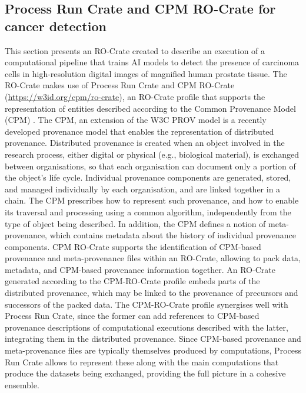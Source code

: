 \documentclass[10pt,letterpaper]{article}
\begin{document}
\subsection{Process Run Crate and CPM RO-Crate for cancer detection}\label{process-run-crate-and-cpm-ro-crate-for-cancer-detection}

This section presents an RO-Crate created to describe an execution of a computational pipeline that trains AI models to detect the presence of carcinoma cells in high-resolution digital images of magnified human prostate tissue.
The RO-Crate makes use of Process Run Crate and CPM RO-Crate (\url{https://w3id.org/cpm/ro-crate}), an RO-Crate profile that supports the representation of entities described according to the Common Provenance Model (CPM) \cite{Wittner 2022,Wittner 2023b}. 
The CPM, an extension of the W3C PROV model \cite{Moreau 2013} is a recently developed provenance model that enables the representation of distributed provenance. 
Distributed provenance is created when an object involved in the research process, either digital or physical (e.g., biological material), is exchanged between organisations, so that each organisation can document only a portion of the object’s life cycle. 
Individual provenance components are generated, stored, and managed individually by each organisation, and are linked together in a chain. 
The CPM prescribes how to represent such provenance, and how to enable its traversal and processing using a common algorithm, independently from the type of object being described. 
In addition, the CPM defines a notion of meta-provenance, which contains metadata about the history of individual provenance components. 
CPM RO-Crate supports the identification of CPM-based provenance and meta-provenance files within an RO-Crate, allowing to pack data, metadata, and CPM-based provenance information together. 
An RO-Crate generated according to the CPM-RO-Crate profile embeds parts of the distributed provenance, which may be linked to the provenance of precursors and successors of the packed data. 
The CPM-RO-Crate profile synergises well with Process Run Crate, since the former can add references to CPM-based provenance descriptions of computational executions described with the latter, integrating them in the distributed provenance. Since CPM-based provenance and meta-provenance files are typically themselves produced by computations, Process Run Crate allows to represent these along with the main computations that produce the datasets being exchanged, providing the full picture in a cohesive ensemble.
\end{document}
